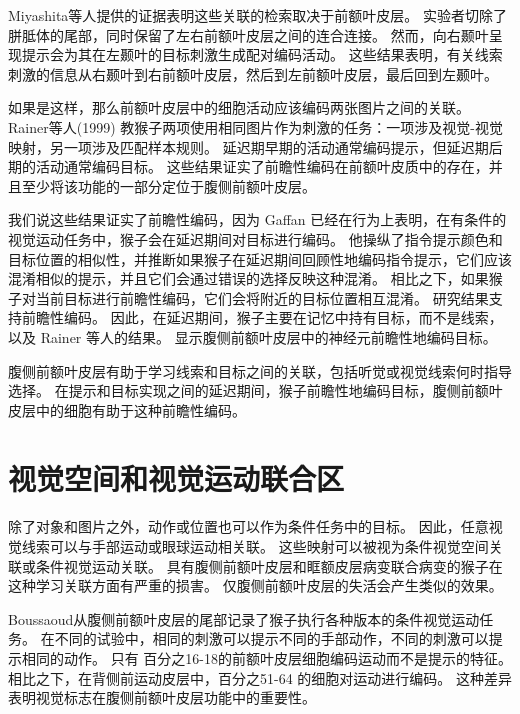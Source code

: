 Miyashita等人\cite{miyashita2004cognitive}提供的证据表明这些关联的检索取决于前额叶皮层。
实验者切除了胼胝体的尾部，同时保留了左右前额叶皮层之间的连合连接\cite{tomita1999top}。
然而，向右颞叶呈现提示会为其在左颞叶的目标刺激生成配对编码活动。 
这些结果表明，有关线索刺激的信息从右颞叶到右前额叶皮层，然后到左前额叶皮层，最后回到左颞叶\cite{hasegawa1998callosal,tomita1999top}。
\par


如果是这样，那么前额叶皮层中的细胞活动应该编码两张图片之间的关联。 
Rainer等人(1999) 教猴子两项使用相同图片作为刺激的任务：一项涉及视觉-视觉映射，另一项涉及匹配样本规则。 
延迟期早期的活动通常编码提示，但延迟期后期的活动通常编码目标。 
这些结果证实了前瞻性编码在前额叶皮质中的存在，并且至少将该功能的一部分定位于腹侧前额叶皮层。
\par


我们说这些结果证实了前瞻性编码，因为 Gaffan\cite{gaffan1977response} 已经在行为上表明，在有条件的视觉运动任务中，猴子会在延迟期间对目标进行编码。 
他操纵了指令提示颜色和目标位置的相似性，并推断如果猴子在延迟期间回顾性地编码指令提示，它们应该混淆相似的提示，并且它们会通过错误的选择反映这种混淆。 
相比之下，如果猴子对当前目标进行前瞻性编码，它们会将附近的目标位置相互混淆。
研究结果支持前瞻性编码。 
因此，在延迟期间，猴子主要在记忆中持有目标，而不是线索，以及 Rainer 等人的结果。 
显示腹侧前额叶皮层中的神经元前瞻性地编码目标。
\par


腹侧前额叶皮层有助于学习线索和目标之间的关联，包括听觉或视觉线索何时指导选择。
在提示和目标实现之间的延迟期间，猴子前瞻性地编码目标，腹侧前额叶皮层中的细胞有助于这种前瞻性编码。



\section{视觉空间和视觉运动联合区}
\par

除了对象和图片之外，动作或位置也可以作为条件任务中的目标。 
因此，任意视觉线索可以与手部运动\cite{bussey2001role}或眼球运动\cite{asaad1998neural}相关联。 
这些映射可以被视为条件视觉空间关联或条件视觉运动关联。 
具有腹侧前额叶皮层和眶额皮层病变联合病变的猴子在这种学习关联方面有严重的损害\cite{bussey2001role}。 
仅腹侧前额叶皮层的失活会产生类似的效果\cite{wang2000deficit}。
\par


Boussaoud\cite{boussaoud1993primate}从腹侧前额叶皮层的尾部记录了猴子执行各种版本的条件视觉运动任务。 
在不同的试验中，相同的刺激可以提示不同的手部动作，不同的刺激可以提示相同的动作。
只有 百分之16-18的前额叶皮层细胞编码运动而不是提示的特征。
相比之下，在背侧前运动皮层中，百分之51-64 的细胞对运动进行编码。 
这种差异表明视觉标志在腹侧前额叶皮层功能中的重要性。
\par


